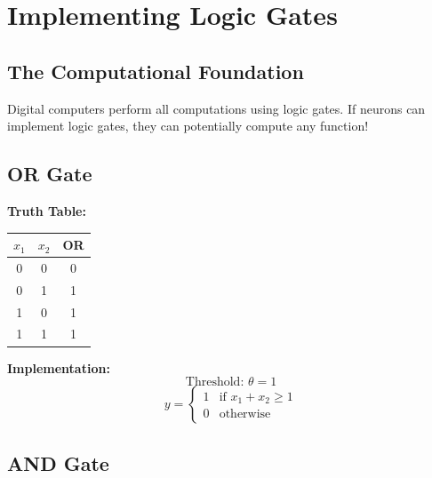 
\section{Implementing Logic Gates}

\subsection{The Computational Foundation}

Digital computers perform all computations using logic gates. If neurons can implement logic gates, they can potentially compute any function!

\subsection{OR Gate}

\begin{minipage}{0.45\textwidth}
\textbf{Truth Table:}
\begin{center}
\begin{tabular}{|c|c|c|}
\hline
$x_1$ & $x_2$ & OR \\ \hline
0 & 0 & 0 \\ \hline
0 & 1 & 1 \\ \hline
1 & 0 & 1 \\ \hline
1 & 1 & 1 \\ \hline
\end{tabular}
\end{center}
\end{minipage}
\hfill
\begin{minipage}{0.45\textwidth}
\textbf{Implementation:}
\[
\text{Threshold: } \theta = 1
\]
\[
y = \begin{cases} 1 & \text{if } x_1 + x_2 \geq 1 \\ 0 & \text{otherwise} \end{cases}
\]
\end{minipage}

\subsection{AND Gate}

